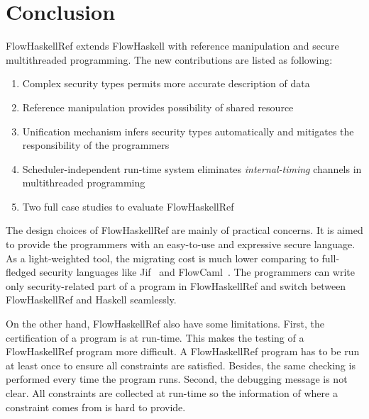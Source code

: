 \documentclass{report}
\begin{document}
\section{Conclusion}
FlowHaskellRef extends FlowHaskell with reference manipulation and secure multithreaded programming.
The new contributions are listed as following:
\begin{enumerate}
\item Complex security types permits more accurate description of data
\item Reference manipulation provides possibility of shared resource
\item Unification mechanism infers security types automatically and mitigates the responsibility of the programmers
\item Scheduler-independent run-time system eliminates {\em internal-timing} channels in multithreaded programming
\item Two full case studies to evaluate FlowHaskellRef
\end{enumerate}

The design choices of FlowHaskellRef are mainly of practical concerns. 
It is aimed to provide the programmers with an easy-to-use and expressive secure language.
As a light-weighted tool, the migrating cost is much lower comparing to full-fledged security languages
like Jif~\cite{jif} and FlowCaml~\cite{FlowCaml}.
The programmers can write only security-related part of a program in FlowHaskellRef and switch between 
FlowHaskellRef and Haskell seamlessly.

On the other hand, FlowHaskellRef also have some limitations. First, the certification of a program is at
run-time. This makes the testing of a FlowHaskellRef program more difficult. A FlowHaskellRef program has to be 
run at least once to ensure all constraints are satisfied. Besides, the same checking is performed every time
the program runs. Second, the debugging message is not clear. All constraints are collected at run-time so
the information of where a constraint comes from is hard to provide.




\end{document}
